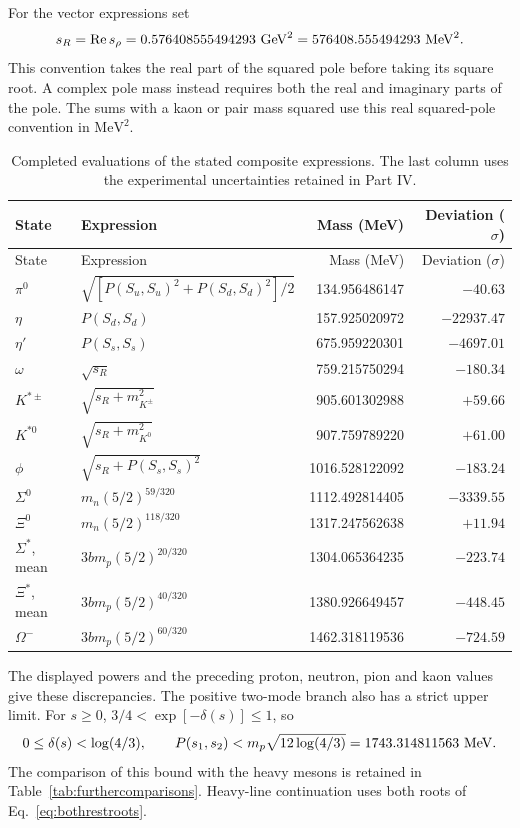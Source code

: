 \documentclass[aps,prx,onecolumn,10pt,notitlepage,nofootinbib,longbibliography]{revtex4-2}
\numberwithin{equation}{section}
\numberwithin{table}{section}
\begin{document}
For the vector expressions set
\begin{equation}
 s_R=\operatorname{Re}s_\rho
 =0.576408555494293\ {\rm GeV}^2
 =576408.555494293\ {\rm MeV}^2.
 \label{eq:realsquaredpoleSI}
\end{equation}
This convention takes the real part of the squared pole before taking its square root. A complex pole mass instead requires both the real and imaginary parts of the pole. The sums with a kaon or pair mass squared use this real squared-pole convention in $\mathrm{MeV}^2$.

\begingroup\small
\setlength{\tabcolsep}{4pt}
\renewcommand{\arraystretch}{1.1}
\begin{longtable}{@{}l p{} rr@{}}
\caption{Completed evaluations of the stated composite expressions. The last column uses the experimental uncertainties retained in Part IV.}\label{tab:literalcompositesSI}\\
\toprule State&Expression&Mass (MeV)&Deviation ($\sigma$)\\\midrule
\endfirsthead
\toprule State&Expression&Mass (MeV)&Deviation ($\sigma$)\\\midrule
\endhead
\bottomrule\endfoot
$\pi^0$&$\sqrt{[P(S_u,S_u)^2+P(S_d,S_d)^2]/2}$&134.956486147&$-40.63$\\
$\eta$&$P(S_d,S_d)$&157.925020972&$-22937.47$\\
$\eta'$&$P(S_s,S_s)$&675.959220301&$-4697.01$\\
$\omega$&$\sqrt{s_R}$&759.215750294&$-180.34$\\
$K^{*\pm}$&$\sqrt{s_R+m_{K^\pm}^2}$&905.601302988&$+59.66$\\
$K^{*0}$&$\sqrt{s_R+m_{K^0}^2}$&907.759789220&$+61.00$\\
$\phi$&$\sqrt{s_R+P(S_s,S_s)^2}$&1016.528122092&$-183.24$\\
\pagebreak
$\Sigma^0$&$m_n(5/2)^{59/320}$&1112.492814405&$-3339.55$\\
$\Xi^0$&$m_n(5/2)^{118/320}$&1317.247562638&$+11.94$\\
$\Sigma^*$, mean&$3bm_p(5/2)^{20/320}$&1304.065364235&$-223.74$\\
$\Xi^*$, mean&$3bm_p(5/2)^{40/320}$&1380.926649457&$-448.45$\\
$\Omega^-$&$3bm_p(5/2)^{60/320}$&1462.318119536&$-724.59$\\
\end{longtable}
\endgroup

The displayed powers and the preceding proton, neutron, pion and kaon values give these discrepancies. The positive two-mode branch also has a strict upper limit. For $s\geq0$, $3/4<\exp[-\delta(s)]\leq1$, so
\begin{equation}
 0\leq\delta(s)<\log(4/3),\qquad
 P(s_1,s_2)<m_p\sqrt{12\log(4/3)}
 =1743.314811563\ {\rm MeV}.
 \label{eq:heavybranchboundSI}
\end{equation}
The comparison of this bound with the heavy mesons is retained in
Table~\ref{tab:furthercomparisons}. Heavy-line continuation uses both roots
of Eq.~\eqref{eq:bothrestroots}.
\end{document}
